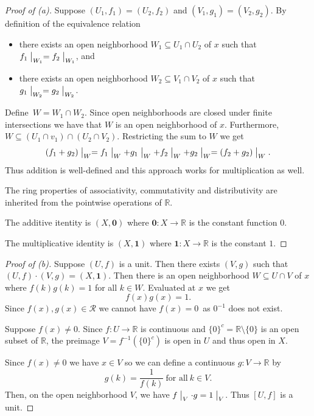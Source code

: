 \begin{proof}[Proof of (a)]
    Suppose $(U_1,f_1) = (U_2, f_2)$ and 
    $(V_1, g_1) = (V_2, g_2)$. By definition of the equivalence 
    relation 
    \begin{itemize}
        \item there exists an open neighborhood 
            $W_1 \subseteq U_1\cap U_2$ of $x$ such that 
            $f_1\bigm|_{W_1} = f_2\bigm|_{W_1}$, and 
        \item there exists an open neighborhood 
            $W_2 \subseteq V_1\cap V_2$ of $x$ such that 
            $g_1\bigm|_{W_2} = g_2\bigm|_{W_2}$.
    \end{itemize}
    Define $W = W_1 \cap W_2$. Since open neighborhoods 
    are closed under finite intersections we have that 
    $W$ is an open neighborhood of $x$. Furthermore, 
    $W \subseteq (U_1 \cap v_1) \cap (U_2 \cap V_2)$. 
    Restricting the sum to $W$ we get 
    \[
        (f_1 + g_2) \bigm|_W 
        = f_1\bigm|_W + g_1\bigm|_W 
        + f_2\bigm|_W + g_2\bigm|_W 
        = 
        (f_2 + g_2) \bigm|_W. 
    \]
    Thus addition is well-defined and this approach works  
    for multiplication as well. 

    The ring properties of associativity, commutativity and 
    distributivity are inherited from the pointwise operations 
    of $\mathbb R$. 

    The additive itentity is $(X,\textbf{0})$ where 
    $\textbf{0} : X \to \mathbb R$ is the constant 
    function $0$. 

    The multiplicative identity is 
    $(X, \textbf{1})$ where $\textbf{1} : X \to \mathbb R$ is 
    the constant $1$. 
\end{proof}
\begin{proof}[Proof of (b)]
    Suppose $(U,f)$ is a unit. Then there exists 
    $(V,g)$ such that $(U,f)\cdot (V,g) = (X,\textbf{1})$. 
    Then there is an open neighborhood $W \subseteq U \cap V$ 
    of $x$ where $f(k)g(k) = 1$ for all $k \in W$. 
    Evaluated at $x$ we get 
    \[
        f(x)g(x) = 1. 
    \]
    Since $f(x),g(x) \in \mathcal R$ we cannot have 
    $f(x) = 0$ as $0^{-1}$ does not exist.  

    Suppose $f(x) \neq 0$. Since $f: U \to \mathbb R$ is 
    continuous and $\{0\}^c = \mathbb R \setminus \{0\}$ is 
    an open subset of $\mathbb R$, the preimage 
    $V = f^{-1}(\{0\}^c)$ is open in $U$ and thus open 
    in $X$. 

    Since $f(x) \neq 0$ we have $x \in V$ so we can define 
    a continuous $g : V \to \mathbb R$ by 
    \[
        g(k) = \frac{1}{f(k)} \ \text{for all} \ k \in V.
    \]
    Then, on the open neighborhood $V$, we have 
    $f\bigm|_V \cdot g = 1\bigm|_V$. Thus 
    $[U,f]$ is a unit. 
\end{proof}



